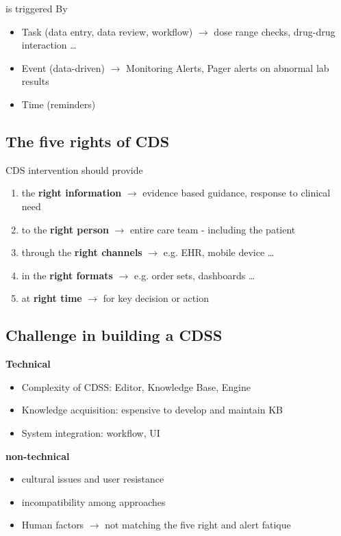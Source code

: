 \documentclass{report}
\theoremstyle{definition}
\theoremstyle{example}
\begin{document}
is triggered By
\begin{itemize}
   \item Task (data entry, data review, workflow) $\rightarrow$ dose range checks, drug-drug interaction \dots
   \item Event (data-driven) $\rightarrow$ Monitoring Alerts, Pager alerts on abnormal lab results
   \item Time (reminders)
\end{itemize}

\subsection{The five rights of CDS}
CDS intervention should provide
\begin{enumerate}
   \item the \textbf{right information} $\rightarrow$ evidence based guidance, response to clinical need
   \item to the \textbf{right person} $\rightarrow$ entire care team - including the patient
   \item through the \textbf{right channels} $\rightarrow$ e.g. EHR, mobile device \dots
   \item in the \textbf{right formats} $\rightarrow$ e.g. order sets, dashboards \dots
   \item at \textbf{right time} $\rightarrow$ for key decision or action
\end{enumerate}

\subsection{Challenge in building a CDSS}
\textbf{Technical}
\begin{itemize}
   \item Complexity of CDSS: Editor, Knowledge Base, Engine
   \item Knowledge acquisition: espensive to develop and maintain KB
   \item System integration: workflow, UI
\end{itemize}

\textbf{non-technical}
\begin{itemize}
   \item cultural issues and user resistance
   \item incompatibility among approaches
   \item Human factors $\rightarrow$ not matching the five right and alert fatique
\end{itemize}
\end{document}
